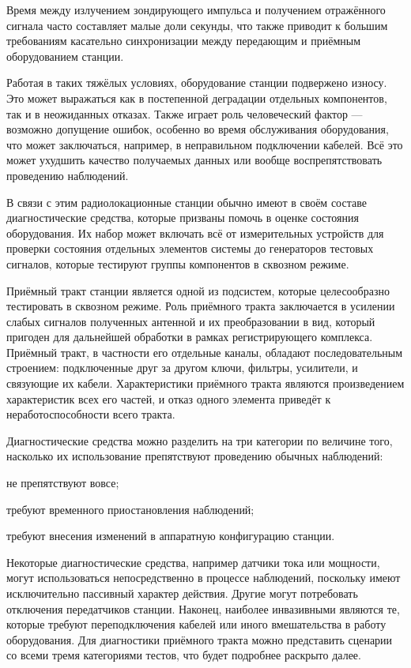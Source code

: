 \documentclass{report}
\begin{document}
Время между излучением зондирующего импульса и получением отражённого сигнала часто составляет малые доли секунды, что также приводит к большим требованиям касательно синхронизации между передающим и приёмным оборудованием станции.

Работая в таких тяжёлых условиях, оборудование станции подвержено износу. Это может выражаться как в постепенной деградации отдельных компонентов, так и в неожиданных отказах. Также играет роль человеческий фактор --- возможно допущение ошибок, особенно во время обслуживания оборудования, что может заключаться, например, в неправильном подключении кабелей. Всё это может ухудшить качество получаемых данных или вообще воспрепятствовать проведению наблюдений.

В связи с этим радиолокационные станции обычно имеют в своём составе диагностические средства, которые призваны помочь в оценке состояния оборудования. Их набор может включать всё от измерительных устройств для проверки состояния отдельных элементов системы до генераторов тестовых сигналов, которые тестируют группы компонентов в сквозном режиме.

Приёмный тракт станции является одной из подсистем, которые целесообразно тестировать в сквозном режиме. Роль приёмного тракта заключается в усилении слабых сигналов полученных антенной и их преобразовании в вид, который пригоден для дальнейшей обработки в рамках регистрирующего комплекса. Приёмный тракт, в частности его отдельные каналы, обладают последовательным строением: подключенные друг за другом ключи, фильтры, усилители, и связующие их кабели. Характеристики приёмного тракта являются произведением характеристик всех его частей, и отказ одного элемента приведёт к неработоспособности всего тракта.

Диагностические средства можно разделить на три категории по величине того, насколько их использование препятствуют проведению обычных наблюдений:

\begin{enummarker}
    \item не препятствуют вовсе;
    \item требуют временного приостановления наблюдений;
    \item требуют внесения изменений в аппаратную конфигурацию станции.
\end{enummarker}

Некоторые диагностические средства, например датчики тока или мощности, могут использоваться непосредственно в процессе наблюдений, поскольку имеют исключительно пассивный характер действия. Другие могут потребовать отключения передатчиков станции. Наконец, наиболее инвазивными являются те, которые требуют переподключения кабелей или иного вмешательства в работу оборудования. Для диагностики приёмного тракта можно представить сценарии со всеми тремя категориями тестов, что будет подробнее раскрыто далее.
\end{document}

